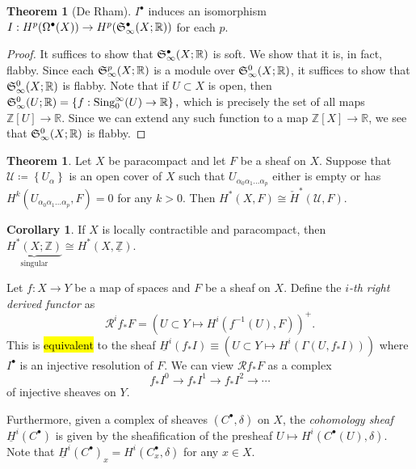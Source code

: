 \documentclass[10pt,letterpaper,cm]{nupset}
\theoremstyle{definition}
\theoremstyle{theorem}
\newtheorem{theorem}[definition]{Theorem}
\newtheorem{corollary}[definition]{Corollary}
\theoremstyle{remark}
\newcommand{\R}{\mathbb{R}}
\newcommand{\Z}{\mathbb Z}
\newcommand{\1}{\mathbb{1}}
\newcommand{\0}{\vec 0}
\DeclareMathOperator{\sing}{Sing}
\begin{document}
\begin{theorem}[De Rham]
$I^{\bullet}$ induces an isomorphism $I: H^{p}(\Omega^{\bullet}(X)) \to H^{p}(\frak{S}_{\infty}^{\bullet}(X; \R))$ for each $p$.
\end{theorem}
\begin{proof}
It suffices to show that $\frak{S}^{\bullet}_{\infty}(X; \R)$ is soft. We show that it is, in fact, flabby. Since each $\frak{S}^p_{\infty}(X; \R)$ is a module over $\frak{S}^0_{\infty}(X; \R)$, it suffices to show that $\frak{S}^0_{\infty}(X; \R)$ is flabby. Note that if $U \subset X$ is open, then  $\frak{S}^0_{\infty}(U; \R) = \left\{f : \sing_0^{\infty}(U) \to \R   \right\},$ which is precisely the set of all  maps $\Z[U] \to \R$. Since we can extend any such function to a map $\Z[X] \to \R$, we see that $\frak{S}^0_{\infty}(X; \R)$ is flabby. 
\end{proof}

\begin{theorem}
Let $X$ be paracompact and let $F$ be a sheaf on $X$. Suppose that $\mathcal{U} \coloneqq \left\{U_{\alpha}\right\}$ is an open cover of $X$ such that $U_{\alpha_0\alpha_1\ldots \alpha_p}$ either is empty or has $H^k(U_{\alpha_0\alpha_1\ldots \alpha_p}, F) =0$ for any $k>0$. Then $H^{\ast}(X, F) \cong \check{H}^{\ast}(\mathcal{U}, F)$.
\end{theorem}

\begin{corollary}
If $X$ is locally contractible and paracompact, then $\underbrace{H^{\ast}(X; \Z)}_{\text{singular}} \cong H^{\ast}(X, \underline{\Z})$.
\end{corollary}

\medskip


Let $f : X \to Y$ be a map of spaces and $F$ be a sheaf on $X$. Define the \textit{$i$-th right derived functor} as $$\mathcal{R}^i{f_{\ast}{F}} = \left( U\subset Y \mapsto H^i(f^{-1}(U), F)  \right)^+.$$ This is \hl{equivalent} to the sheaf $\underline{H}^i(f_{\ast}{I})\equiv (U\subset Y \mapsto H^i(\Gamma(U, f_{\ast}I)))$ where $I^{\bullet}$ is an injective resolution of $F$. We can view $\mathcal{R}f_{\ast}F$ as a complex $$f_{\ast}I^0 \to f_{\ast}I^1 \to f_{\ast}I^2 \to \cdots$$ of injective sheaves on $Y$.

Furthermore, given a complex of sheaves $\left(C^{\bullet}, \delta\right)$ on $X$, the \textit{cohomology sheaf $\underline{H}^i(C^{\bullet})  $} is given by the sheafification of the presheaf $U \mapsto H^i(C^{\bullet}(U), \delta)$. Note that $\underline{H}^i(C^{\bullet})_x = H^i(C^{\bullet}_x, \delta)$ for any $x\in X$.
\end{document}

